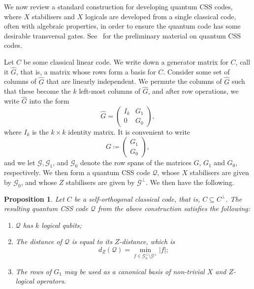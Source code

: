 \documentclass{article}
\newcounter{main}[section]
\newtheorem{proposition}[main]{Proposition}
\begin{document}
We now review a standard construction for developing quantum CSS codes, where $X$ stabilisers and $X$ logicals are developed from a single classical code, often with algebraic properties, in order to ensure the quantum code has some desirable transversal gates. See~\cite{nielsen2000quantum} for the preliminary material on quantum CSS codes.

Let $C$ be some classical linear code. We write down a generator matrix for $C$, call it $\hat{G}$, that is, a matrix whose rows form a basis for $C$. Consider some set of columns of $\hat{G}$ that are linearly independent. We permute the columns of $\hat{G}$ such that these become the $k$ left-most columns of $\hat{G}$, and after row operations, we write $\hat{G}$ into the form
\begin{equation}\label{eq:semi_systematic_form}
    \hat{G} = \begin{pmatrix}
        I_k & G_1\\
        0 & G_0
    \end{pmatrix},
\end{equation}
where $I_k$ is the $k \times k$ identity matrix. It is convenient to write
\begin{equation}\label{eq:X_stab_mat}
    G \coloneq \begin{pmatrix}
        G_1\\
        G_0
    \end{pmatrix},
\end{equation}
and we let $\mathcal{G}, \mathcal{G}_1$, and $\mathcal{G}_0$ denote the row spans of the matrices $G$, $G_1$ and $G_0$, respectively. We then form a quantum CSS code $\mathcal{Q}$, whose $X$ stabilisers are given by $\mathcal{G}_0$, and whose $Z$ stabilisers are given by $\mathcal{G}^\perp$. We then have the following.
\begin{proposition}\label{prop:quantum_code_logical_properties}
    Let $C$ be a self-orthogonal classical code, that is, $C \subseteq C^\perp$. The resulting quantum CSS code $\mathcal{Q}$ from the above construction satisfies the following:
    \begin{enumerate}
        \item $\mathcal{Q}$ has $k$ logical qubits;
        \item The distance of $\mathcal{Q}$ is equal to its $Z$-distance, which is
        \begin{equation}
            d_Z(\mathcal{Q}) = \min_{f \in \mathcal{G}_0^\perp\setminus\mathcal{G}^\perp}|f|;
        \end{equation}
        \item The rows of $G_1$ may be used as a canonical basis of non-trivial $X$ and $Z$-logical operators.
    \end{enumerate}
\end{proposition}
\end{document}
